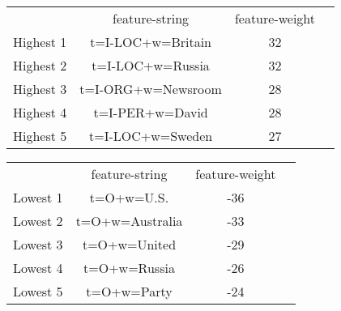 \documentclass[12pt,notitlepage]{article}
\begin{document}
\begin{table}[H]
	\begin{center}
		\begin{tabular}{lccc}
			\multicolumn{1}{l}{}
			& \multicolumn{1}{c}{feature-string}
			& \multicolumn{1}{c}{feature-weight} \\
			\cline{2-3}
			\multicolumn{1}{l}{Highest 1}
			& \multicolumn{1}{|c}{t=I-LOC+w=Britain}
			& \multicolumn{1}{|c|}{32}\\
			\cline{2-3}
			\multicolumn{1}{l}{Highest 2}
			& \multicolumn{1}{|c}{t=I-LOC+w=Russia}
			& \multicolumn{1}{|c|}{32}\\
			\cline{2-3}
			\multicolumn{1}{l}{Highest 3}
			& \multicolumn{1}{|c}{t=I-ORG+w=Newsroom}
			& \multicolumn{1}{|c|}{28}\\
			\cline{2-3}
			\multicolumn{1}{l}{Highest 4}
			& \multicolumn{1}{|c}{t=I-PER+w=David}
			& \multicolumn{1}{|c|}{28}\\
			\cline{2-3}
			\multicolumn{1}{l}{Highest 5}
			& \multicolumn{1}{|c}{t=I-LOC+w=Sweden}
			& \multicolumn{1}{|c|}{27}\\
			\cline{2-3}
		\end{tabular}
	\end{center}
\end{table}

\begin{table}[H]
	\begin{center}
		\begin{tabular}{lccc}
			\multicolumn{1}{l}{}
			& \multicolumn{1}{c}{feature-string}
			& \multicolumn{1}{c}{feature-weight}\\
			\cline{2-3}
			\multicolumn{1}{l}{Lowest 1}
			& \multicolumn{1}{|c}{t=O+w=U.S.}
			& \multicolumn{1}{|c|}{-36}\\
			\cline{2-3}
			\multicolumn{1}{l}{Lowest 2}
			& \multicolumn{1}{|c}{t=O+w=Australia}
			& \multicolumn{1}{|c|}{-33}\\
			\cline{2-3}
			\multicolumn{1}{l}{Lowest 3}
			& \multicolumn{1}{|c}{t=O+w=United}
			& \multicolumn{1}{|c|}{-29}\\
			\cline{2-3}
			\multicolumn{1}{l}{Lowest 4}
			& \multicolumn{1}{|c}{t=O+w=Russia}
			& \multicolumn{1}{|c|}{-26}\\
			\cline{2-3}
			\multicolumn{1}{l}{Lowest 5}
			& \multicolumn{1}{|c}{t=O+w=Party}
			& \multicolumn{1}{|c|}{-24}\\
			\cline{2-3}
		\end{tabular}
	\end{center}
\end{table}
\end{document}
